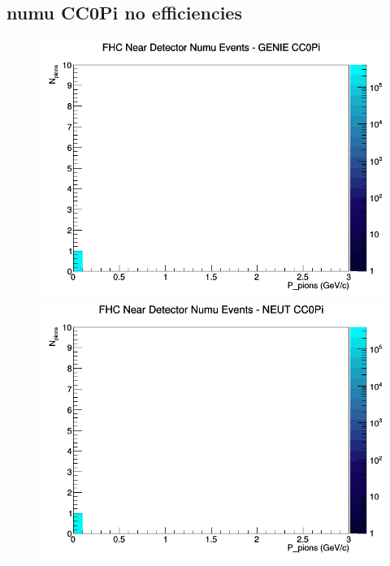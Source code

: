 \documentclass[12pt]{article}
\begin{document}
\subsection{numu CC0Pi no efficiencies}
\begin{figure}[h]
\includegraphics[width=\linewidth]{N_P/nominal/pions/CC0Pi_FHC_ND_numu_N_P_GENIE.png}
\endminipage
{}
\includegraphics[width=\linewidth]{N_P/nominal/pions/CC0Pi_FHC_ND_numu_N_P_NEUT.png}
\endminipage
{}

\end{figure}
\end{document}
